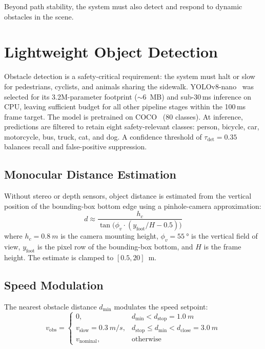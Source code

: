 \documentclass[12pt,letterpaper,oneside]{report}
\begin{document}
Beyond path stability, the system must also detect and respond to dynamic obstacles in the scene.



\section{Lightweight Object Detection}
\label{sec:object_detection}

Obstacle detection is a safety-critical requirement: the system must halt or slow for pedestrians, cyclists, and animals sharing the sidewalk. YOLOv8-nano~\cite{yolov8,redmon2016yolo} was selected for its 3.2M-parameter footprint ($\sim$\SI{6}{MB}) and sub-30\,ms inference on CPU, leaving sufficient budget for all other pipeline stages within the 100\,ms frame target. The model is pretrained on COCO~\cite{coco} (80 classes). At inference, predictions are filtered to retain eight safety-relevant classes: person, bicycle, car, motorcycle, bus, truck, cat, and dog. A confidence threshold of $\tau_\text{det} = 0.35$ balances recall and false-positive suppression.

\subsection{Monocular Distance Estimation}

Without stereo or depth sensors, object distance is estimated from the vertical position of the bounding-box bottom edge using a pinhole-camera approximation:
\begin{equation}
d \approx \frac{h_c}{\tan\!\bigl(\phi_v \cdot (y_{\text{foot}}/H - 0.5)\bigr)}
\end{equation}
where $h_c = \SI{0.8}{m}$ is the camera mounting height, $\phi_v = \SI{55}{\degree}$ is the vertical field of view, $y_\text{foot}$ is the pixel row of the bounding-box bottom, and $H$ is the frame height. The estimate is clamped to $[0.5, 20]$~m.

\subsection{Speed Modulation}

The nearest obstacle distance $d_\text{min}$ modulates the speed setpoint:
\begin{equation}
v_{\text{obs}} =
\begin{cases}
0, & d_{\min} < d_{\text{stop}} = \SI{1.0}{m} \\
v_{\text{slow}} = \SI{0.3}{m/s}, & d_{\text{stop}} \le d_{\min} < d_{\text{close}} = \SI{3.0}{m} \\
v_{\text{nominal}}, & \text{otherwise}
\end{cases}
\end{equation}
\end{document}
